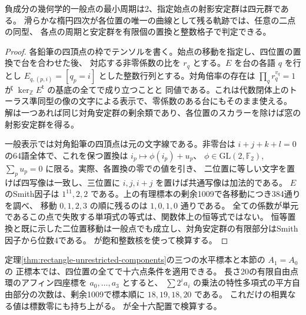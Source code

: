 \begin{corollary}\label{cor:negative-component-period}
負成分の幾何学的一般点の最小周期は2、指定始点の射影安定群は四元群である。
滑らかな楕円四次が各位置の唯一の曲線として残る軌跡では、任意の二点の同型、
各点の周期と安定群を有限個の置換と整数格子で判定できる。
\end{corollary}
\begin{proof}
各鉛筆の四頂点の枠でテンソルを書く。始点の移動を指定し、四位置の置換で台を合わせた後、
対応する非零係数の比を $r_q$ とする。$E$ を台の各語 $q$ を行とし
$E_{q,(p,i)}=[q_p=i]$ とした整数行列とする。対角倍率の存在は
$\prod_q r_q^{v_q}=1$ が $\ker_{\mathbb Z} E^{\mathsf t}$ の基底の全てで成り立つことと
同値である。これは代数閉体上のトーラス準同型の像の文字による表示で、零係数のある台にもそのまま使える。
解は一つあれば同じ対角安定群の剰余類であり、各位置のスカラーを除けば窓の射影安定群を得る。

一般表示では対角鉛筆の四頂点は元の文字線である。非零台は
$i+j+k+l=0$ の64語全体で、これを保つ置換は $i_p\mapsto\phi(i_p)+u_p$、
$\phi\in\mathrm{GL}(2,\mathbb F_2)$, $\sum_p u_p=0$ に限る。実際、各置換の零での値を引き、
二位置に等しい文字を置けば四写像は一致し、三位置に $i,j,i+j$ を置けば共通写像は加法的である。
$E$ のSmith因子は $1^{11},2,2$ である。上の有理標本の剰余1009で各移動につき384通りを調べ、
移動 $0,1,2,3$ の順に残るのは $1,0,1,0$ 通りである。
全ての係数が単元であるこの点で失敗する単項式の等式は、関数体上の恒等式ではない。
恒等置換と既に示した二位置移動は一般点でも成立し、対角安定群の有限部分はSmith因子から位数4である。
 が飽和整数核を使って検算する。
\end{proof}

定理\ref{thm:rectangle-unrestricted-components}の三つの水平標本と本節の $A_1=A_0$ の
正標本では、四位置の全てで十六点条件を適用できる。
長さ20の有限自由点環のアフィン四座標を $a_0,\ldots,a_3$ とすると、
$\sum 2^i a_i$ の乗法の特性多項式の平方自由部分の次数は、剰余1009で標本順に $18,19,18,20$ である。
これだけの相異なる値は標数零にも持ち上がる。
 が全十六配置で検算する。
